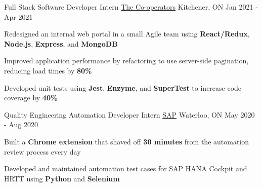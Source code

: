 \begin{cventries}
  \cventry
    {Full Stack Software Developer Intern} %
    {\href{https://www.cooperators.ca/}{The Co-operators}} %
    {Kitchener, ON} %
    {Jan 2021 - Apr 2021} %
    {
      \begin{cvitems} %
      \item {Redesigned an internal web portal in a small Agile team using \textbf{React/Redux}, \textbf{Node.js}, \textbf{Express}, and \textbf{MongoDB}}
      \item {Improved application performance by refactoring to use server-side pagination, reducing load times by \textbf{80\%}}
      \item {Developed unit tests using \textbf{Jest}, \textbf{Enzyme}, and \textbf{SuperTest} to increase code coverage by \textbf{40\%}}
      \end{cvitems}
    }
    
  \cventry
    {Quality Engineering Automation Developer Intern} %
    {\href{https://www.sap.com/canada/index.html}{SAP}} %
    {Waterloo, ON} %
    {May 2020 - Aug 2020} %
    {
      \begin{cvitems} %
      \item {Built a \textbf{Chrome extension} that shaved off \textbf{30 minutes} from the automation review process every day}
      \item {Developed and maintained automation test cases for SAP HANA Cockpit and HRTT using \textbf{Python} and \textbf{Selenium}}
      \end{cvitems}
    }
       
\end{cventries}
